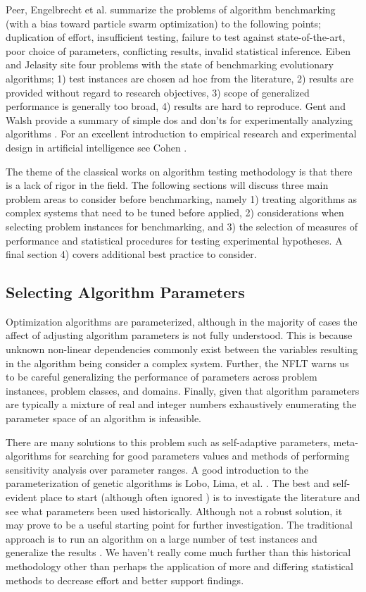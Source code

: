 \documentclass[a4paper, 11pt]{article}
\begin{document}
Peer, Engelbrecht et al. \cite{Peer2003} summarize the problems of algorithm benchmarking (with a bias toward particle swarm optimization) to the following points; duplication of effort, insufficient testing, failure to test against state-of-the-art, poor choice of parameters, conflicting results, invalid statistical inference. Eiben and Jelasity \cite{Eiben2002} site four problems with the state of benchmarking evolutionary algorithms; 1) test instances are chosen ad hoc from the literature, 2) results are provided without regard to research objectives, 3) scope of generalized performance is generally too broad, 4) results are hard to reproduce.
Gent and Walsh provide a summary of simple dos and don'ts for experimentally analyzing algorithms \cite{Gent1994}. For an excellent introduction to empirical research and experimental design in artificial intelligence see Cohen \cite{Cohen1995}.

The theme of the classical works on algorithm testing methodology is that there is a lack of rigor in the field. The following sections will discuss three main problem areas to consider before benchmarking, namely 1) treating algorithms as complex systems that need to be tuned before applied, 2) considerations when selecting problem instances for benchmarking, and 3) the selection of measures of performance and statistical procedures for testing experimental hypotheses. A final section 4) covers additional best practice to consider.


% 
% 
\subsection{Selecting Algorithm Parameters}
Optimization algorithms are parameterized, although in the majority of cases the affect of adjusting algorithm parameters is not fully understood. This is because unknown non-linear dependencies commonly exist between the variables resulting in the algorithm being consider a complex system. Further, the NFLT warns us to be careful generalizing the performance of parameters across problem instances, problem classes, and domains. Finally, given that algorithm parameters are typically a mixture of real and integer numbers exhaustively enumerating the parameter space of an algorithm is infeasible.

There are many solutions to this problem such as self-adaptive parameters, meta-algorithms for searching for good parameters values and methods of performing sensitivity analysis over parameter ranges. A good introduction to the parameterization of genetic algorithms is Lobo, Lima, et al. \cite{Lobo2007}. The best and self-evident place to start (although often ignored \cite{Eiben2002}) is to investigate the literature and see what parameters been used historically. Although not a robust solution, it may prove to be a useful starting point for further investigation. The traditional approach is to run an algorithm on a large number of test instances and generalize the results \cite{Schaffer1989}. We haven't really come much further than this historical methodology other than perhaps the application of more and differing statistical methods to decrease effort and better support findings.
\end{document}
